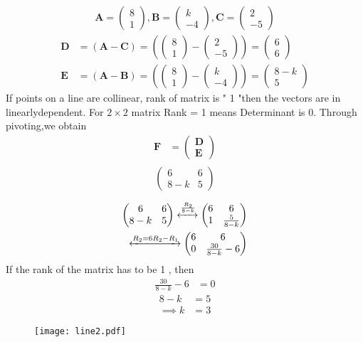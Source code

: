 \documentclass[journal,10pt,twocolumn]{article}
\newcommand{\myvec}[1]{\ensuremath{\begin{pmatrix}#1\end{pmatrix}}}
\let\vec\mathbf
\providecommand{\brak}[1]{\ensuremath{\left(#1\right)}}
\let\vec\mathbf
\begin{document}
\begin{enumerate}
\begin{align}  
\vec{A}=\myvec{8 \\ 1},
\vec{B}=\myvec{k \\ -4},
\vec{C}=\myvec{2 \\ -5}
\end{align}
\begin{align}  
 \vec{D} &=\brak{\vec{A}-\vec{C}} = \brak{\myvec{8 \\1 } - \myvec{2 \\-5 } } = \myvec{6 \\ 6 }\\
\vec{E} &= \brak{\vec{A}-\vec{B}} = \brak{\myvec{8 \\ 1 } - \myvec{k \\-4 } } = \myvec{8-k \\5}
\end{align}
If points on a line  are  collinear, rank of matrix is " 1 "then the vectors are in linearlydependent.
For $2\times2$ matrix Rank = 1 means Determinant is 0.
Through pivoting,we obtain
\begin{align}
\vec{F} &={\myvec{\vec{D}\\ \vec{E}}}
\end{align}
\begin{align}
\begin{split}
\myvec{
6 & 6
 \\
8-k & 5
}
\end{split}
\end{align}
\begin{align}
\label{eq:chem_balance_mat_row}
\myvec{
6 & 6
\\
8-k & 5
}
 \xleftrightarrow[]{\frac{R_2}{8-k}}
\myvec{
6 & 6
\\
1 & \frac{5}{8-k}
}
\\
\xleftrightarrow[]{R_2 = 6R_2-R_1}
\myvec{
6 & 6
\\
0 & \frac{30}{8-k}-6
}
\end{align}
If the rank of the matrix has to be 1 , then
\begin{align}
\frac{30}{8-k}-6 &=0
\end{align}
\begin{align}
 8-k &=5
\\
\implies k &=3
\end{align}
\begin{figure}[h]
	  \centering 
	  \texttt{[image: line2.pdf]}
	  \caption{}
	  \label{fig:line2.png}
	  \end{figure}
\end{enumerate} 
\end{document}
